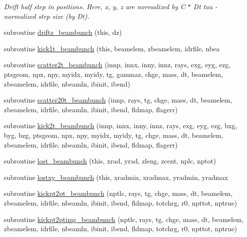 \begin{DoxyCompactItemize}
\begin{DoxyCompactList}\small\item\em Drift half step in positions. Here, x, y, z are normalized by C $\ast$ Dt tau -\/ normalized step size (by Dt). \end{DoxyCompactList}\item 
subroutine \mbox{\hyperlink{namespacebeambunchclass_a653727137cda46af62ebf20a0bcb9ab8}{driftz\+\_\+beambunch}} (this, dz)
\item 
subroutine \mbox{\hyperlink{namespacebeambunchclass_ac4e7c6a08c052c9bbc3c2bb1703adea6}{kick1t\+\_\+beambunch}} (this, beamelem, zbeamelem, idrfile, nbea
\item 
subroutine \mbox{\hyperlink{namespacebeambunchclass_a4353d7ca4b2e80df2e71209df5b0e36c}{scatter2t\+\_\+beambunch}} (innp, innx, inny, innz, rays, exg, eyg, ezg, ptsgeom, npx, npy, myidx, myidy, tg, gammaz, chge, mass, dt, beamelem, zbeamelem, idrfile, nbeamln, ibinit, ibend)
\item 
subroutine \mbox{\hyperlink{namespacebeambunchclass_a950cb67b3fefb93f3d3a492fdef5b998}{scatter20t\+\_\+beambunch}} (innp, rays, tg, chge, mass, dt, beamelem, zbeamelem, idrfile, nbeamln, ibinit, ibend, fldmap, flagerr)
\item 
subroutine \mbox{\hyperlink{namespacebeambunchclass_a13904891d2d14b332c4178871e861363}{kick2t\+\_\+beambunch}} (innp, innx, inny, innz, rays, exg, eyg, ezg, bxg, byg, bzg, ptsgeom, npx, npy, myidx, myidy, tg, chge, mass, dt, beamelem, zbeamelem, idrfile, nbeamln, ibinit, ibend, fldmap, flagerr)
\item 
subroutine \mbox{\hyperlink{namespacebeambunchclass_a7cccd378d69c7b51808b6d96d3151e50}{lost\+\_\+beambunch}} (this, xrad, yrad, zleng, zcent, nplc, nptot)
\item 
subroutine \mbox{\hyperlink{namespacebeambunchclass_a68be93e06f8b6c65ee45af2e08610396}{lostxy\+\_\+beambunch}} (this, xradmin, xradmax, yradmin, yradmax
\item 
subroutine \mbox{\hyperlink{namespacebeambunchclass_a8a635f6138c645606329c5c4b81bdf51}{kickpt2pt\+\_\+beambunch}} (nptlc, rays, tg, chge, mass, dt, beamelem, zbeamelem, idrfile, nbeamln, ibinit, ibend, fldmap, totchrg, r0, npttot, nptrue)
\item 
subroutine \mbox{\hyperlink{namespacebeambunchclass_a01fdab4efb6d28b0604dfadfdbf302c1}{kickpt2ptimg\+\_\+beambunch}} (nptlc, rays, tg, chge, mass, dt, beamelem, zbeamelem, idrfile, nbeamln, ibinit, ibend, fldmap, totchrg, r0, npttot, nptrue)
\item 

\end{DoxyCompactItemize}
